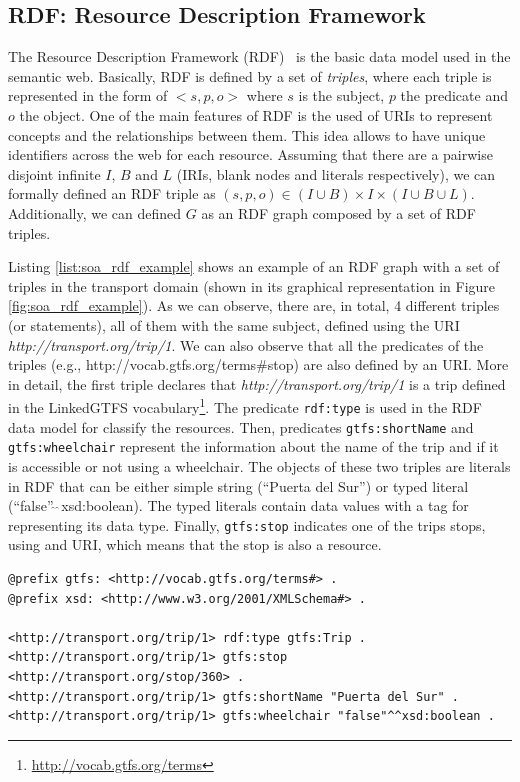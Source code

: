 \subsection{RDF: Resource Description Framework}
The Resource Description Framework (RDF)~\citep{RDF} is the basic data model used in the semantic web. Basically, RDF is defined by a set of \textit{triples}, where each triple is represented in the form of $<s,p,o>$ where $s$ is the subject, $p$ the predicate and $o$ the object. One of the main features of RDF is the used of URIs to represent concepts and the relationships between them. This idea allows to have unique identifiers across the web for each resource. Assuming that there are a pairwise disjoint infinite $I$, $B$ and $L$ (IRIs, blank nodes and literals respectively), we can formally defined an RDF triple as $(s,p,o) \in (I \cup B) \times I \times (I \cup B \cup L)$. Additionally, we can defined $G$ as an RDF graph composed by a set of RDF triples.

Listing \ref{list:soa_rdf_example} shows an example of an RDF graph with a set of triples in the transport domain (shown in its graphical representation in Figure \ref{fig:soa_rdf_example}). As we can observe, there are, in total, 4 different triples (or statements), all of them with the same subject, defined using the URI \textit{http://transport.org/trip/1}. We can also observe that all the predicates of the triples (e.g., http://vocab.gtfs.org/terms\#stop) are also defined by an URI. More in detail, the first triple declares that \textit{http://transport.org/trip/1} is a trip defined in the LinkedGTFS vocabulary\footnote{\url{http://vocab.gtfs.org/terms}}. The predicate \texttt{rdf:type} is used in the RDF data model for classify the resources. Then, predicates \texttt{gtfs:shortName} and \texttt{gtfs:wheelchair} represent the information about the name of the trip and if it is accessible or not using a wheelchair. The objects of these two triples are literals in RDF that can be either simple string (``Puerta del Sur'') or typed literal (``false''$\hat{\;}\hat{\;}$xsd:boolean). The typed literals contain data values with a tag for representing its data type. Finally, \texttt{gtfs:stop} indicates one of the trips stops, using and URI, which means that the stop is also a resource. 


\begin{lstlisting}[float,caption=Example of RDF graph,frame=tlrb,label={list:soa_rdf_example}, columns=fullflexible]
@prefix gtfs: <http://vocab.gtfs.org/terms#> .
@prefix xsd: <http://www.w3.org/2001/XMLSchema#> .

<http://transport.org/trip/1> rdf:type gtfs:Trip .
<http://transport.org/trip/1> gtfs:stop <http://transport.org/stop/360> .
<http://transport.org/trip/1> gtfs:shortName "Puerta del Sur" .
<http://transport.org/trip/1> gtfs:wheelchair "false"^^xsd:boolean .
\end{lstlisting}

